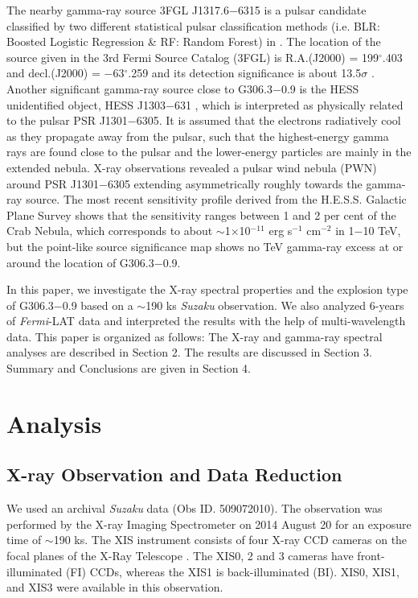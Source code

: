 \documentclass[useAMS,usenatbib]{mn2e}
\begin{document}
The nearby gamma-ray source 3FGL J1317.6$-$6315 is a pulsar candidate classified by two different statistical pulsar classification methods (i.e. BLR: Boosted Logistic Regression \& RF: Random Forest) in \citet{Saz16}. The location of the source given in the 3rd Fermi Source Catalog (3FGL) is R.A.(J2000) = 199$^{\circ}\!\!$.403 and decl.(J2000) = $-$63$^{\circ}\!\!$.259 and its detection significance is about 13.5$\sigma$ \citep{Ac15}. Another significant gamma-ray source close to G306.3$-$0.9 is the HESS unidentified object, HESS J1303$-$631 \citep{Ah05, HE11}, which is interpreted as physically related to the pulsar PSR J1301$-$6305. It is assumed that the electrons radiatively cool as they propagate away from the pulsar, such that the highest-energy gamma rays are found close to the pulsar and the lower-energy particles are mainly in the extended nebula. X-ray observations revealed a pulsar wind nebula (PWN) around PSR J1301$-$6305 extending asymmetrically roughly towards the gamma-ray source. The most recent sensitivity profile derived from the H.E.S.S. Galactic Plane Survey \citep{Do16} shows that the sensitivity ranges between 1 and 2 per cent of the Crab Nebula, which corresponds to about $\sim$1$\times$10$^{-11}$ erg s$^{-1}$ cm$^{-2}$ in 1$-$10 TeV, but the point-like source significance map shows no TeV gamma-ray excess at or around the location of G306.3$-$0.9.

In this paper, we investigate the X-ray spectral properties and the explosion type of G306.3$-$0.9 based on a $\sim$190 ks {\it Suzaku} observation. We also analyzed 6-years of {\it Fermi}-LAT data and interpreted the results with the help of multi-wavelength data. This paper is organized as follows: The X-ray and gamma-ray spectral analyses are described in Section 2. The results are discussed in Section 3. Summary and Conclusions are given in Section 4.


\section{Analysis}

\subsection{X-ray Observation and Data Reduction}
We used an archival {\it Suzaku} data (Obs ID. 509072010). The observation was performed by the X-ray Imaging Spectrometer \citep[XIS;][]{Ko07} on 2014 August 20 for an exposure time of $\sim$190 ks. The XIS instrument consists of four X-ray CCD cameras on the focal planes of the X-Ray Telescope \citep[XRT;][]{Se07}. The XIS0, 2 and 3 cameras have front-illuminated (FI) CCDs, whereas the XIS1 is back-illuminated (BI). XIS0, XIS1, and XIS3 were available in this observation.  
\end{document}
